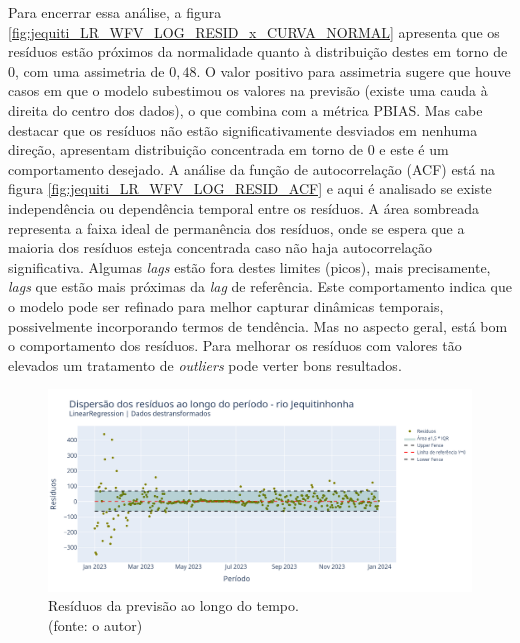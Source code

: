 Para encerrar essa análise, a figura \ref{fig:jequiti_LR_WFV_LOG_RESID_x_CURVA_NORMAL} apresenta que os resíduos estão próximos da normalidade quanto à distribuição destes em torno de $0$, com uma assimetria de $0,48$. O valor positivo para assimetria sugere que houve casos em que o modelo subestimou os valores na previsão (existe uma cauda à direita do centro dos dados), o que combina com a métrica PBIAS. Mas cabe destacar que os resíduos não estão significativamente desviados em nenhuma direção, apresentam distribuição concentrada em torno de $0$ e este é um comportamento desejado. A análise da função de autocorrelação (ACF) está na figura \ref{fig:jequiti_LR_WFV_LOG_RESID_ACF} e aqui é analisado se existe independência ou dependência temporal entre os resíduos. A área sombreada representa a faixa ideal de permanência dos resíduos, onde se espera que a maioria dos resíduos esteja concentrada caso não haja autocorrelação significativa. Algumas \textit{lags} estão fora destes limites (picos), mais precisamente, \textit{lags} que estão mais próximas da \textit{lag} de referência. Este comportamento indica que o modelo pode ser refinado para melhor capturar dinâmicas temporais, possivelmente incorporando termos de tendência. Mas no aspecto geral, está bom o comportamento dos resíduos. Para melhorar os resíduos com valores tão elevados um tratamento de \textit{outliers} pode verter bons resultados.

\begin{figure}[!h]
	\centering
	\includegraphics[scale=0.33]{Figuras/jequiti/wfv/LR/LR_WFV_LOG_RESID_x_TEMPO.png}
	\caption{Resíduos da previsão ao longo do tempo.\\(fonte: o autor)}
	\label{fig:jequiti_LR_WFV_LOG_RESID_x_TEMPO}
\end{figure}

